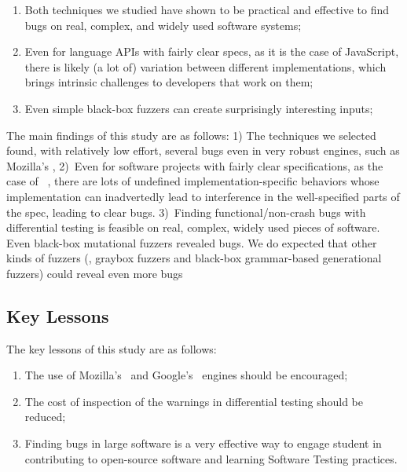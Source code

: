 \documentclass[smallextended]{svjour3}
\begin{document}
\begin{enumerate}
  \item Both techniques we studied have shown to be practical and
    effective to find bugs on real, complex, and widely used software
    systems;
  \item Even for language APIs with fairly clear specs, as it is the
    case of JavaScript, there is likely (a lot of) variation between
    different implementations, which brings intrinsic challenges to
    developers that work on them;
  \item Even simple black-box fuzzers can create surprisingly
    interesting inputs;

\end{enumerate}


The main findings of this study are as follows: 1) The techniques we
selected found, with relatively low effort, several bugs even in very
robust engines, such as Mozilla's \smonkey, 2)~Even for software
projects with fairly clear specifications, as the case of
\javascript{}~\cite{ecmas262-spec}, there are lots of undefined
implementation-specific behaviors whose implementation can
inadvertedly lead to interference in the well-specified parts of the
spec, leading to clear bugs. 3)~Finding functional/non-crash bugs with
differential testing is feasible on real, complex, widely used pieces
of software. Even black-box mutational fuzzers revealed bugs. We do
expected that other kinds of fuzzers (\eg{}, graybox fuzzers and
black-box grammar-based generational fuzzers) could reveal even more
bugs

\subsection{Key Lessons}
\label{sec:lessons}

The key lessons of this study are as follows:

\begin{enumerate}
\item The use of Mozilla's \smonkey\ and Google's \veight\ engines
  should be encouraged;
\item The cost of inspection of the warnings in differential testing
  should be reduced;
\item Finding bugs in large software is a very effective way to engage
  student in contributing to open-source software and learning
  Software Testing practices.
\end{enumerate}
\end{document}
